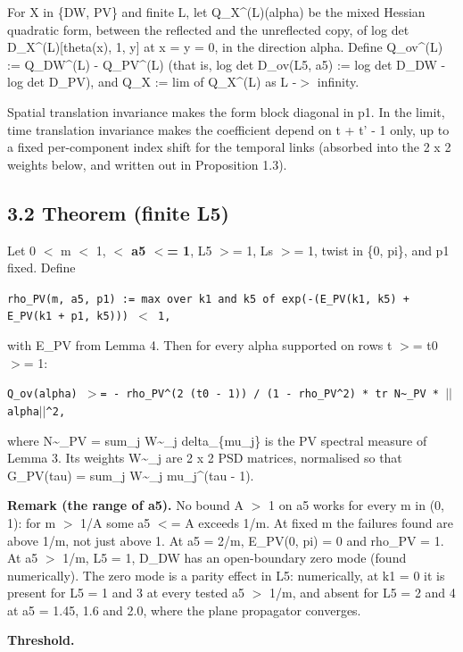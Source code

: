\documentclass[11pt,a4paper]{article}
\begin{document}
For X in \{DW, PV\} and finite L, let Q\_X\textasciicircum{}(L)(alpha) be the mixed Hessian quadratic form, between the reflected and the
unreflected copy, of log det D\_X\textasciicircum{}(L)[theta(x), 1, y] at x = y = 0, in the direction alpha. Define
Q\_ov\textasciicircum{}(L) := Q\_DW\textasciicircum{}(L) - Q\_PV\textasciicircum{}(L) (that is, log det D\_ov(L5, a5) := log det D\_DW - log det D\_PV), and Q\_X := lim of
Q\_X\textasciicircum{}(L) as L -$>$ infinity.

Spatial translation invariance makes the form block diagonal in p1. In the limit, time translation invariance makes
the coefficient depend on t + t' - 1 only, up to a fixed per-component index shift for the temporal links (absorbed
into the 2 x 2 weights below, and written out in Proposition 1.3).


\subsection*{3.2 Theorem (finite L5)}
Let 0 $<$ m $<$ 1, {\bfseries{} $<$ a5 $<$= 1}, L5 $>$= 1, Ls $>$= 1, twist in \{0, pi\}, and p1 fixed. Define

\texttt{rho\_PV(m, a5, p1) := max over k1 and k5 of exp(-(E\_PV(k1, k5) + E\_PV(k1 + p1, k5))) $<$ 1,}

with E\_PV from Lemma 4. Then for every alpha supported on rows t $>$= t0 $>$= 1:

\texttt{Q\_ov(alpha)  $>$=  - rho\_PV\textasciicircum{}(2 (t0 - 1)) / (1 - rho\_PV\textasciicircum{}2) * tr N\textasciitilde{}\_PV * $|$$|$alpha$|$$|$\textasciicircum{}2,}

where N\textasciitilde{}\_PV = sum\_j W\textasciitilde{}\_j delta\_\{mu\_j\} is the PV spectral measure of Lemma 3. Its weights W\textasciitilde{}\_j are 2 x 2 PSD matrices,
normalised so that G\_PV(tau) = sum\_j W\textasciitilde{}\_j mu\_j\textasciicircum{}(tau - 1).

{\bfseries\boldmath Remark (the range of a5).} No bound A $>$ 1 on a5 works for every m in (0, 1): for m $>$ 1/A some a5 $<$= A exceeds
1/m. At fixed m the failures found are above 1/m, not just above 1. At a5 = 2/m, E\_PV(0, pi) = 0 and rho\_PV = 1. At
a5 $>$ 1/m, L5 = 1, D\_DW has an open-boundary zero mode (found numerically). The zero mode is a parity effect in L5:
numerically, at k1 = 0 it is present for L5 = 1 and 3 at every tested a5 $>$ 1/m, and absent for L5 = 2 and 4 at
a5 = 1.45, 1.6 and 2.0, where the plane propagator converges.

{\bfseries\boldmath Threshold.}
\end{document}
